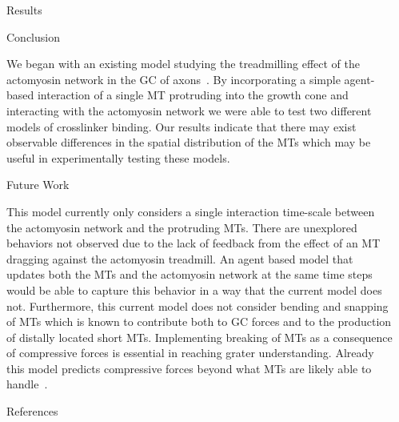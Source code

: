 \documentclass{beamer}
\newlength{\sepwidth}
\newlength{\colwidth}
\newcommand{\separatorcolumn}{\begin{column}{\sepwidth}\end{column}}
\begin{document}
\begin{frame}[t]
\begin{columns}[t]
\begin{column}{\colwidth}
\begin{block}{Results}
\end{block}

\begin{block}{Conclusion}

We began with an existing model studying the treadmilling effect of the actomyosin network in the GC of axons~\cite{craig_membrane_2012}. By incorporating a simple agent-based interaction of a single MT protruding into the growth cone and interacting with the actomyosin network we were able to test two different models of crosslinker binding. Our results indicate that there may exist observable differences in the spatial distribution of the MTs which may be useful in experimentally testing these models.

\end{block}

\begin{block}{Future Work}

This model currently only considers a single interaction time-scale between the actomyosin network and the protruding MTs. There are unexplored behaviors not observed due to the lack of feedback from the effect of an MT dragging against the actomyosin treadmill. An agent based model that updates both the MTs and the actomyosin network at the same time steps would be able to capture this behavior in a way that the current model does not. Furthermore, this current model does not consider bending and snapping of MTs which is known to contribute both to GC forces and to the production of distally located short MTs. Implementing breaking of MTs as a consequence of compressive forces is essential in reaching grater understanding. Already this model predicts compressive forces beyond what MTs are likely able to handle~\cite{takasone_flexural_2002}.

\end{block}

\begin{block}{References}
\begin{multicols}{2}
\fontsize{16pt}{12pt}\selectfont

% 

\end{multicols}
\end{block}

\end{column}
\separatorcolumn%

\end{columns}
\end{frame}
\end{document}
